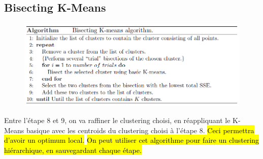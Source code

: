 \documentclass[letterpaper, 12pt]{article}
\begin{document}
		\subsection{Bisecting K-Means}
			\begin{figure}[H]
				\centering
				\includegraphics[scale=0.7]{Images/bisecting_k-means_algo.png}
				\caption{}
				\label{fig:k-means:bissecting:algo}
			\end{figure}\noindent
			Entre l'étape 8 et 9, on va raffiner le clustering choisi, en 
				réappliquant le K-Means basique avec les centroids
				du clustering
				choisi à l'étape 8.\hl{ Ceci permettra d'avoir un optimum
				local.}
				\hl{On peut utiliser cet algorithme pour faire un clustering 
				hiérarchique, en sauvegardant chaque étape.}
\end{document}
